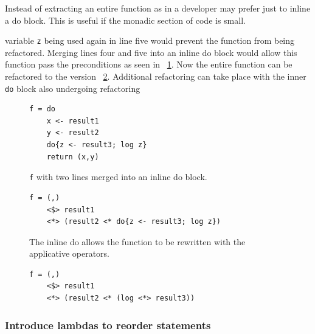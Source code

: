 Instead of extracting an entire function as in \DIFdelbegin {}\DIFdelend \DIFaddbegin {}\DIFaddend a developer may prefer just to inline a do block. This is useful if the monadic section of code is small.

\DIFdelbegin {}\DIFdelend \DIFaddbegin {}\DIFaddend variable \texttt{z} being used again in line five would prevent the function from being refactored. Merging lines four and five into an inline do block would allow this function pass the preconditions as seen in \DIFdelbegin {}\DIFdelend \DIFaddbegin {}\DIFaddend ~\ref{inlineDo}. Now the entire function can be refactored to the version \DIFdelbegin {}\DIFdelend \DIFaddbegin {}\DIFaddend ~\ref{inlineDo_ref}. Additional refactoring can \DIFaddbegin {}\DIFaddend take place with the inner \texttt{do} block also undergoing refactoring\DIFdelbegin {}\DIFdelend \DIFaddbegin {}\DIFaddend 

\begin{figure}[t]
\begin{lstlisting}
f = do
	x <- result1
	y <- result2
	do{z <- result3; log z}
	return (x,y)
\end{lstlisting}
\caption{\texttt{f} with two lines merged into an inline do block.}
\label{inlineDo}
\end{figure}

\begin{figure}[t]
\begin{lstlisting}
f = (,) 
    <$> result1 
    <*> (result2 <* do{z <- result3; log z})
\end{lstlisting}
\caption{The inline do allows the function to be rewritten with the applicative operators.}
\label{inlineDo_ref}
\end{figure}

\DIFaddbegin \begin{figure}[t]
\begin{lstlisting}
f = (,) 
    <$> result1
    <*> (result2 <* (log <*> result3))
\end{lstlisting}
\caption{}
\label{zLog}
\end{figure}

\DIFaddend \subsubsection{Introduce lambdas to reorder statements}
\DIFaddbegin \label{lambdaIntro}
\DIFaddend 

